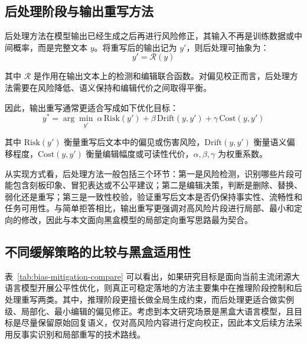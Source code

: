 \subsection{后处理阶段与输出重写方法}

后处理方法在模型输出已经生成之后再进行风险修正，其输入不再是训练数据或中间概率，而是完整文本 $y$。将重写后的输出记为 $y'$，则后处理可抽象为：
\begin{equation}
y'=\mathcal{R}(y)
\end{equation}

其中 $\mathcal{R}$ 是作用在输出文本上的检测和编辑联合函数。对偏见校正而言，后处理方法需要在风险降低、语义保持和编辑代价之间取得平衡。

因此，输出重写通常更适合写成如下优化目标：
\begin{equation}
y^{*}=\arg\min_{y'} \ \alpha \, \mathrm{Risk}(y') + \beta \, \mathrm{Drift}(y,y') + \gamma \, \mathrm{Cost}(y,y')
\end{equation}

其中 $\mathrm{Risk}(y')$ 衡量重写后文本中的偏见或伤害风险，$\mathrm{Drift}(y,y')$ 衡量语义偏移程度，$\mathrm{Cost}(y,y')$ 衡量编辑幅度或可读性代价，$\alpha,\beta,\gamma$ 为权重系数。

从实现方式看，后处理方法一般包括三个环节：第一是风险检测，识别哪些片段可能包含刻板印象、冒犯表达或不公平建议；第二是编辑决策，判断是删除、替换、弱化还是重写；第三是一致性校验，验证重写后文本是否仍保持事实性、流畅性和任务可用性\cite{DBLP:conf/aaai/PryzantMDKJY20,DBLP:conf/acl/AmrheinSSL23,DBLP:conf/emnlp/MajumderHM23}。与简单拒答相比，输出重写更强调对高风险片段进行局部、最小和定向的修改，因此与本文面向黑盒模型的局部定向重写思路最为契合。

\subsection{不同缓解策略的比较与黑盒适用性}

表~\ref{tab:bias-mitigation-compare} 可以看出，如果研究目标是面向当前主流闭源大语言模型开展公平性优化，则真正可稳定落地的方法主要集中在推理阶段控制和后处理重写两类。其中，推理阶段更擅长做全局生成约束，而后处理更适合做实例级、局部化、最小编辑的偏见修正。考虑到本文研究场景是黑盒大语言模型，且目标是尽量保留原始回复语义，仅对高风险内容进行定向校正，因此本文后续方法采用反事实识别和局部重写的技术路线。

